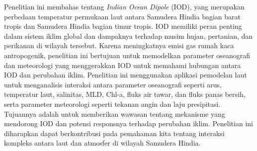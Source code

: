 \begin{spacing}{1.5}
	\pagestyle{empty}
	\begin{center}
		\vskip 1cm
		\justifying
		Penelitian ini membahas tentang \textit{Indian Ocean Dipole} (IOD), yang merupakan perbedaan temperatur permukaan laut antara Samudera Hindia bagian barat tropis dan Samudera Hindia bagian timur tropis. IOD memiliki peran penting dalam sistem iklim global dan dampaknya terhadap musim hujan, pertanian, dan perikanan di wilayah tersebut. Karena meningkatnya emisi gas rumah kaca antropogenik, penelitian ini bertujuan untuk memodelkan parameter oseanografi dan meteorologi yang menggerakkan IOD untuk memahami hubungan antara IOD dan perubahan iklim. Penelitian ini menggunakan aplikasi pemodelan laut untuk menganalisis interaksi antara parameter oseanografi seperti arus, temperatur laut, salinitas, MLD, Chl-a, fluks air tawar, dan fluks panas bersih, serta parameter meteorologi seperti tekanan angin dan laju presipitasi. Tujuannya adalah untuk memberikan wawasan tentang mekanisme yang mendorong IOD dan potensi responsnya terhadap perubahan iklim. Penelitian ini diharapkan dapat berkontribusi pada pemahaman kita tentang interaksi kompleks antara laut dan atmosfer di wilayah Samudera Hindia.
	\end{center}
\end{spacing}
\pagestyle{empty}